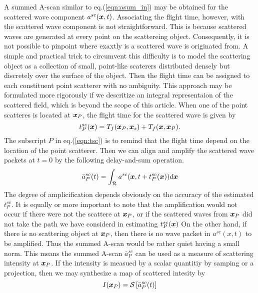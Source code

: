 ﻿\documentclass[11pt,a4j]{article}
\begin{document}
A summed A-scan similar to eq.(\ref{eqn:asum_in}) may be obtained for the 
scattered wave component $a^{sc}(\mbox{\boldmath $x$},t)$. 
Associating the flight time, however, with the scattered wave component is not straightforward. 
This is because scattered waves are generated at every point on the scattereing object. 
Consequently, it is not possible to pinpoint where exaxtly is a scattered wave is originated from. 
 A simple and practical trick to circumvent this difficulty is to model the scattering object 
 as a collection of small, point-like scaterers distributed densely but discretely over 
 the surface of the object. Then the flight time can be assigned to each constituent point scatterer 
 with no ambiguity. This approach may be formulated more rigorously if we descritize an 
 integral representaion of the scattered field, which is beyond the scope of this article.
When one of the point scatteres is located at $\mbox{\boldmath $x$}_P$, the flight time for the scattered wave 
 is given by 
\begin{equation}
	t_P^{sc}(\mbox{\boldmath $x$})=
	T_f(\mbox{\boldmath $x$}_P,\mbox{\boldmath $x$}_s)
	+
	T_f(\mbox{\boldmath $x$},\mbox{\boldmath $x$}_P).
	\label{eqn:tsc}
\end{equation}
The subscript $P$ in eq.(\ref{eqn:tsc}) is to remind that the flight time depend 
on the location of the point scatterer.
Then we can align and amplify the scattered wave packets at $t=0$ by the following delay-and-sum operation. 
\begin{equation}
	\bar{a}^{sc}_P(t)=\int _{\cal R} a^{sc}(\mbox{\boldmath $x$},t+t^{sc}_P(\mbox{\boldmath $x$}))d\mbox{\boldmath $x$}
	\label{eqn:asum_sc}
\end{equation}
The degree of amplicification depends obviously on the accuracy of the estimated $t^{sc}_P$. 
It is equally or more important to note that the amplification would not occur 
if there were not the scattere at $\mbox{\boldmath $x$}_P$, or if the scattered waves from $\mbox{\boldmath $x$}_P$ did 
not take the path we have considerd in estimating $t^{sc}_P(\mbox{\boldmath $x$})$
On the other hand, if there is no scattering object at $\mbox{\boldmath $x$}_P$, then there is no wave packet in $a^{sc}(x,t)$ 
to be amplified. Thus the summed A-scan would be rather quiet having a small norm.
This means the summed A-scan $\bar a^{sc}_P$ can be used as a measure of scattering intensity at $\mbox{\boldmath $x$}_P$. 
If the intensity is measued by a scalar quantitiy by samping or a projection, then we may synthesize a 
map of scattered intesity by 
\begin{equation}
	I(\mbox{\boldmath $x$}_P)={\cal S} \left[ \bar{a}^{sc}_P(t) \right]
	\label{eqn:}
\end{equation}
\end{document}
